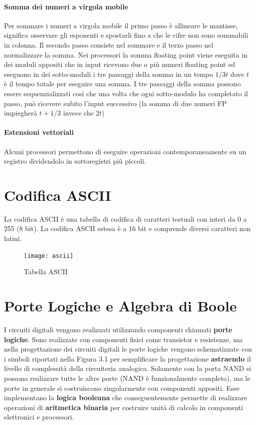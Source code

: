 \paragraph{Somma dei numeri a virgola mobile}

Per sommare i numeri a virgola mobile il primo passo è allineare le mantisse, significa osservare gli esponenti e spostarli fino a che le cifre non sono sommabili in colonna.
Il secondo passo consiste nel sommare e il terzo passo nel normalizzare la somma. Nei processori la somma floating point viene eseguita in dei moduli appositi che in input ricevono due o più numeri floating point ed eseguono in dei sotto-moduli i tre passaggi della somma in un tempo $ 1/3 t $ dove $ t $ è il tempo totale per eseguire una somma. I tre passaggi della somma possono essere sequenzializzati così che una volta che ogni sotto-modulo ha completato il passo, può ricevere subito l'input successivo (la somma di due numeri FP impiegherà $ t + 1/3 $ invece che $ 2t $)

\paragraph{Estensioni vettoriali}
Alcuni processori permettono di eseguire operazioni contemporaneamente su un registro dividendolo in sottoregistri più piccoli. 

\section{Codifica ASCII}
La codifica ASCII è una tabella di codifica di caratteri testuali con interi da 0 a 255 (8 bit). La codifica ASCII estesa è a 16 bit e comprende diversi caratteri non latini.

\begin{figure}
	\caption{Tabella ASCII}
	\texttt{[image: ascii]}
\end{figure}

\section{Porte Logiche e Algebra di Boole}

I circuiti digitali vengono realizzati utilizzando componenti chiamati \textbf{porte logiche}. Sono realizzate con componenti fisici come transistor e resistenze, ma nella progettazione dei circuiti digitali le porte logiche vengono schematizzate con i simboli riportati nella Figura 3.1 per semplificare la progettazione \textbf{astraendo} il livello di complessità della circuiteria analogica.
Solamente con la porta NAND si possono realizzare tutte le altre porte (NAND è funzionalmente completo), ma le porte in generale si costruiscono singolarmente con componenti appositi. Esse implementano la \textbf{logica booleana} che conseguentemente permette di realizzare operazioni di \textbf{aritmetica binaria} per costruire unità di calcolo in componenti elettronici e processori.

